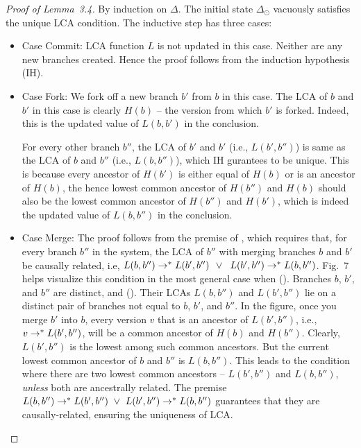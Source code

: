 \begin{proof}[Proof of Lemma~3.4]

  By induction on $\Delta$. The initial state $\Delta_{\odot}$
  vacuously satisfies the unique LCA condition. The inductive step has
  three cases:
  \begin{itemize}
    \item Case {\sc Commit}: LCA function $L$ is not updated in this
      case. Neither are any new branches created. Hence the proof
      follows from the induction hypothesis (IH).

    \item Case {\sc Fork}: We fork off a new branch $b'$ from $b$ in
      this case. The LCA of $b$ and $b'$ in this case is clearly
      $H(b)$ -- the version from which $b'$ is forked. Indeed, this is
      the updated value of $L(b,b')$ in the conclusion.  
      
      For every other branch $b''$, the LCA of $b'$ and $b'$ (i.e.,
      $L(b',b'')$) is same as the LCA of $b$ and $b''$ (i.e.,
      $L(b,b'')$), which IH gurantees to be unique. This is because
      every ancestor of $H(b')$ is either equal of $H(b)$ or is an
      ancestor of $H(b)$, the hence lowest common ancestor of $H(b'')$
      and $H(b)$ should also be the lowest common ancestor of $H(b'')$
      and $H(b')$, which is indeed the updated value of $L(b,b'')$ in
      the conclusion.

    \item Case {\sc Merge}: The proof follows from the premise
    of , which requires that, for every branch $b''$ in
    the system, the LCA of $b''$ with merging branches $b$ and $b'$ be
    causally related, i.e, $L(b,b'') \rightarrow^{*} L(b',b'') ~~\vee~$
    $L(b',b'') \rightarrow^{*} L(b,b'')$. Fig.~7
    helps visualize this condition in the most general case when
    (). Branches $b$, $b'$, and $b''$ are distinct, and
    (). Their LCAs $L(b,b'')$ and $L(b',b'')$ lie on a distinct
    pair of branches not equal to $b$, $b'$, and $b''$. In the figure,
    once you merge $b'$ into $b$, every version $v$ that is an
    ancestor of $L(b',b'')$, i.e., $v \rightarrow^{*} L(b',b'')$, will be  a
    common ancestor of $H(b)$ and $H(b'')$. Clearly, $L(b',b'')$ is
    the lowest among such common ancestors. But the current lowest
    common ancestor of $b$ and $b''$ is $L(b,b'')$. This leads to
    the condition where there are two lowest common ancestors --
    $L(b',b'')$ and $L(b,b'')$, \emph{unless} both are ancestrally
    related. The premise
    $L(b,b'') \rightarrow^{*} L(b',b'') ~\vee~ L(b',b'') \rightarrow^{*} L(b,b'')$
    guarantees that they are causally-related, ensuring the uniqueness
    of LCA.


\end{itemize}
\end{proof}
